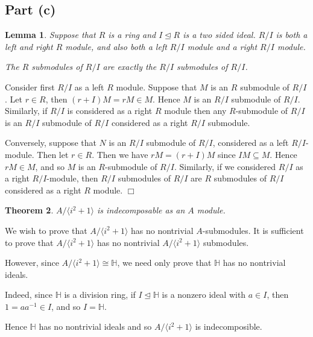 \documentclass[10pt]{article}
\newtheorem{theorem}{Theorem}
\newtheorem{lemma}[theorem]{Lemma}
\newenvironment{proof}[1][Proof]{\begin{trivlist}
\item[\hskip \labelsep {\bfseries #1}]}{\end{trivlist}}
\newcommand{\isom}{\cong}
\begin{document}
\subsection*{Part (c)}
\begin{lemma}
    Suppose that $R$ is a ring and $I\unlhd R$ is a two sided ideal.
    $R/I$ is both a left and right $R$ module, and also
    both a left $R/I$ module and a right $R/I$ module.
    
    The $R$ submodules of 
    $R/I$ are exactly the $R/I$ submodules of $R/I$.
\end{lemma}
\begin{proof}
    Consider first $R/I$ as a left $R$ module.
    Suppose that $M$ is an $R$ submodule of $R/I$. Let $r \in R$, then
    $(r+I)M = rM \in M$. Hence $M$ is an $R/I$ submodule of $R/I$. 
    Similarly, if $R/I$ is considered as a right $R$ module
    then any $R$-submodule of $R/I$ is an $R/I$ submodule of $R/I$ considered
    as a right $R/I$ submodule.
    
    Conversely, suppose that $N$ is an $R/I$ submodule of $R/I$, considered
    as a left $R/I$-module. Then let $r \in R$.
    Then we have $rM = (r+I)M$ since $IM\subseteq M$. Hence $rM \in M$, and 
    so $M$ is an $R$-submodule of $R/I$. Similarly, if we considered
    $R/I$ as a right $R/I$-module, then $R/I$ submodules of $R/I$
    are $R$ submodules of $R/I$ considered as a right $R$ module. $\Box$    
    
\end{proof}

\begin{theorem}
    $A/\langle i^2+1\rangle$ is indecomposable as an $A$ module.
\end{theorem}
\begin{proof}
    We wish to prove that $A/\langle i^2+1\rangle$ has no nontrivial $A$-submodules.
    It is sufficient to prove that $A/\langle i^2+1\rangle$ has no nontrivial $A/\langle i^2+1\rangle$
    submodules. 
    
    However, since $A/\langle i^2+1\rangle \isom \mathbb{H}$, we need only prove
    that $\mathbb{H}$
    has no nontrivial ideals.
    
    Indeed, since $\mathbb{H}$ is a division ring, if $I\unlhd \mathbb{H}$
    is a nonzero ideal with $a \in I$, then $1 = aa^{-1} \in I$, and so $I = \mathbb{H}$.
    
    Hence $\mathbb{H}$ has no nontrivial ideals and so $A/\langle i^2+1\rangle$ is indecomposible.    
\end{proof}
\end{document}
